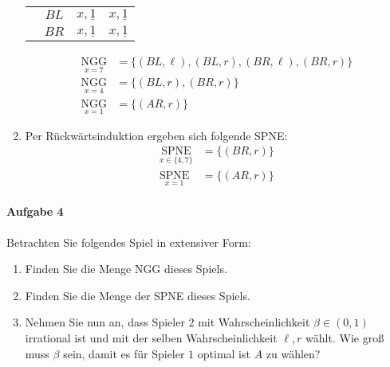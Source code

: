 \begin{enumerate}
\begin{center}
\begin{minipage}{0.30\textwidth}
\begin{tabular}{cccc}
          & $BL$ & $x,\underline{1}$ & $x,\underline{1}$\\
          & $BR$ & $x,\underline{1}$ & $x,\underline{1}$
        \end{tabular}
      \end{minipage}
    \end{center}
    \begin{align*}
      \underset{x=7}{\text{NGG}} & = \{(BL, \ell), (BL, r), (BR, \ell), (BR, r)\}\\
      \underset{x=4}{\text{NGG}} & = \{(BL, r), (BR, r)\}\\
      \underset{x=1}{\text{NGG}} & = \{(AR, r)\}
    \end{align*}

  \item Per Rückwärtsinduktion ergeben sich folgende SPNE:
    \begin{align*}
      \underset{x \in \{4,7\}}{\text{SPNE}} & = \{(BR, r)\}\\
      \underset{x=1}{\text{SPNE}} & = \{(AR, r)\}
    \end{align*}
\end{enumerate}


\paragraph{Aufgabe 4}%
\label{par:aufgabe_4}

Betrachten Sie folgendes Spiel in extensiver Form:
\begin{center}
\end{center}

\begin{enumerate}
  \item Finden Sie die Menge NGG dieses Spiels.
  \item Finden Sie die Menge der SPNE dieses Spiels.
  \item Nehmen Sie nun an, dass Spieler 2 mit Wahrscheinlichkeit $\beta \in (0,1)$
    irrational ist und mit der selben Wahrscheinlichkeit $\ell, r$ wählt.
    Wie groß muss $\beta$ sein, damit es für Spieler $1$ optimal ist $A$ zu wählen?
\end{enumerate}

